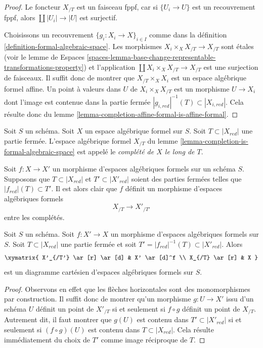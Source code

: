 \begin{proof}
Le foncteur $X_{/T}$ est un faisceau fppf, car si
$\{U_i \to U\}$ est un recouvrement fppf, alors
$\coprod |U_i| \to |U|$ est surjectif.

\medskip\noindent
Choisissons un recouvrement $\{g_i : X_i \to X\}_{i \in I}$ comme dans la définition
\ref{definition-formal-algebraic-space}.
Les morphismes $X_i \times_X X_{/T} \to X_{/T}$ sont \'etales
(voir le lemme de Espaces
\ref{spaces-lemma-base-change-representable-transformations-property})
et l'application $\coprod X_i \times_X X_{/T} \to X_{/T}$ est une surjection de
faisceaux. Il suffit donc de montrer que $X_{/T} \times_X X_i$
est un espace algébrique formel affine. Un point à valeurs dans $U$ de
$X_i \times_X X_{/T}$ est un morphisme $U \to X_i$ dont l'image est
contenue dans la partie fermée
$|g_{i, red}|^{-1}(T) \subset |X_{i, red}|$. Cela résulte donc du
lemme \ref{lemma-completion-affine-formal-is-affine-formal}.
\end{proof}

\begin{definition}
\label{definition-completion-formal-algebraic-space}
Soit $S$ un schéma. Soit $X$ un espace algébrique formel sur $S$.
Soit $T \subset |X_{red}|$ une partie fermée. L'espace algébrique formel
$X_{/T}$ du lemme \ref{lemma-completion-is-formal-algebraic-space}
est appelé le {\it complété de $X$ le long de $T$}.
\end{definition}

\noindent
Soit $f : X \to X'$ un morphisme d'espaces algébriques formels sur un schéma $S$.
Supposons que $T \subset |X_{red}|$ et $T' \subset |X'_{red}|$
soient des parties fermées telles que $|f_{red}|(T) \subset T'$. Il est alors clair que
$f$ définit un morphisme d'espaces algébriques formels
$$
X_{/T} \longrightarrow X'_{/T'}
$$
entre les complétés.

\begin{lemma}
\label{lemma-map-recompletions}
Soit $S$ un schéma. Soit $f : X' \to X$ un morphisme
d'espaces algébriques formels sur $S$. Soit $T \subset |X_{red}|$
une partie fermée et soit $T' = |f_{red}|^{-1}(T) \subset |X'_{red}|$.
Alors
$$
\xymatrix{
X'_{/T'} \ar[r] \ar[d] & X' \ar[d]^f \\
X_{/T} \ar[r] & X
}
$$
est un diagramme cartésien d'espaces algébriques formels sur $S$.
\end{lemma}

\begin{proof}
Observons en effet que les flèches horizontales sont des monomorphismes
par construction. Il suffit donc de montrer qu'un morphisme
$g : U \to X'$ issu d'un schéma $U$ définit un point de $X'_{/T}$
si et seulement si $f \circ g$ définit un point de $X_{/T}$.
Autrement dit, il faut montrer que
$g(U)$ est contenu dans $T' \subset |X'_{red}|$
si et seulement si $(f \circ g)(U)$ est contenu dans $T \subset |X_{red}|$.
Cela résulte immédiatement du choix de $T'$ comme
image réciproque de $T$.
\end{proof}

